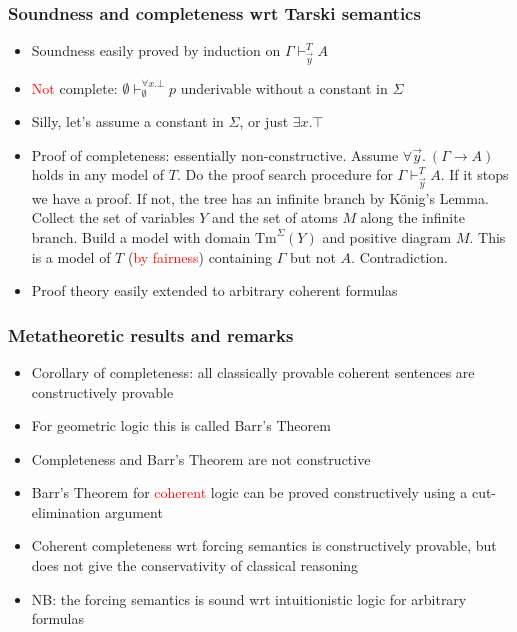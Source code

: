 \documentclass[handout,11pt]{beamer}
\newcommand{\red}[1]{\textcolor{red}{#1}}
\begin{document}
\begin{frame}
\frametitle{Soundness and completeness wrt Tarski semantics}
 \begin{itemize}[<+->]   %
    \item Soundness easily proved by induction on $\Gamma\vdash_{\vec{y}}^T A$
    \item \red{Not} complete: $\emptyset\vdash_{\emptyset}^{\forall x.\bot} p$
    underivable without a constant in $\Sigma$
    \item Silly, let's assume a constant in $\Sigma$, or just $\exists x.\top$
    \item Proof of completeness: essentially non-constructive.
    Assume $\forall\vec{y}.~(\Gamma \to A)$ holds in any model of $T$.
    Do the proof search procedure for $\Gamma\vdash_{\vec{y}}^T A$.
    If it stops we have a proof. If not, the tree has an infinite branch
    by K\"onig's Lemma. Collect the set of variables $Y$ and the set
    of atoms $M$ along the infinite branch. Build a model with domain
    $\mathrm{Tm}^\Sigma(Y)$ and positive diagram $M$. This is a model of
    $T$ (\red{by fairness}) containing $\Gamma$ but not $A$. Contradiction.
 
    \item Proof theory easily extended to arbitrary coherent formulas
 \end{itemize}
\end{frame}

\begin{frame}
\frametitle{Metatheoretic results and remarks}
 \begin{itemize}[<+->]   %
    \item Corollary of completeness: 
    all classically provable coherent sentences are constructively provable
    \item For \alert{geometric} logic this is called Barr's Theorem
    \item Completeness and Barr's Theorem are \alert{not} constructive
    \item Barr's Theorem for \red{coherent} logic can be proved 
    constructively using a cut-elimination argument %
    \item Coherent completeness wrt forcing semantics is constructively
    provable, but does not give the conservativity of classical reasoning
    \item NB: the forcing semantics is sound wrt intuitionistic logic 
    for arbitrary formulas
 \end{itemize}
\end{frame}
\end{document}
